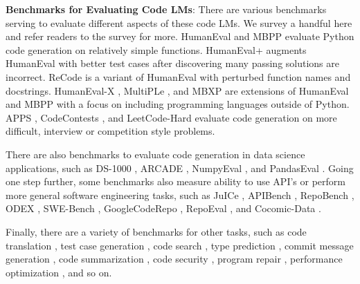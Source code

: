 \documentclass{article}
\theoremstyle{plain}
\theoremstyle{definition}
\theoremstyle{remark}
\begin{document}
\noindent \textbf{Benchmarks for Evaluating Code LMs}: There are various benchmarks serving to evaluate different aspects of these code LMs. We survey a handful here and refer readers to the survey \citep{zhang2023survey} for more. HumanEval \citep{chen2021evaluating} and MBPP \citep{austin2021program} evaluate Python code generation on relatively simple functions. HumanEval+ \citep{liu2023your} augments HumanEval with better test cases after discovering many passing solutions are incorrect. ReCode \citep{wang2022recode} is a variant of HumanEval with perturbed function names and docstrings. HumanEval-X  \citep{zheng2023codegeex}, MultiPLe \citep{cassano2022multipl}, and MBXP \citep{athiwaratkun2022multi} are extensions of HumanEval and MBPP with a focus on including programming languages outside of Python. APPS \citep{hendrycks2021measuring}, CodeContests \citep{li2022competition}, and LeetCode-Hard \citep{shinn2023reflexion} evaluate code generation on more difficult, interview or competition style problems.

There are also benchmarks to evaluate code generation in data science applications, such as DS-1000 \citep{lai2023ds}, ARCADE \citep{yin2022natural}, NumpyEval \citep{zhang2023toolcoder}, and PandasEval \citep{jain2022jigsaw}. Going one step further, some benchmarks also measure ability to use API's or perform more general software engineering tasks, such as JuICe \citep{agashe2019juice}, APIBench \citep{patil2023gorilla}, RepoBench \citep{liu2023repobench}, ODEX \citep{wang2022execution}, SWE-Bench \citep{jimenez2023swe}, GoogleCodeRepo \citep{shrivastava2023repository}, RepoEval \citep{zhang2023repocoder}, and Cocomic-Data \citep{ding2022cocomic}.

Finally, there are a variety of benchmarks for other tasks, such as code translation \citep{roziere2020unsupervised, zhu2022xlcost, ahmad-etal-2021-avatar}, test case generation \citep{tufano2022methods2test, watson2020learning}, code search \citep{husain2019codesearchnet}, type prediction \citep{mir2022type4py, wei2023typet5, malik2019nl2type}, commit message generation \citep{liu2020atom}, code summarization \citep{leclair2019neural, iyer2016summarizing, barone2017parallel, hasan2021codesc, alon2018code2seq}, code security \citep{liguori2022can, pearce2022asleep, tony2023llmseceval}, program repair \citep{jiang2023impact, xia2022practical, tufano2019empirical, haque2022fixeval, jin2023inferfix, gupta2017deepfix, berabi2021tfix}, performance optimization \citep{garg2022deepperf, madaan2023learning}, and so on.
\end{document}
